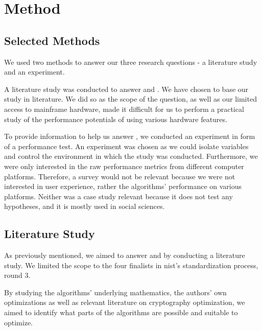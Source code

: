\chapter{Method}
\label{chapter:method}

\section{Selected Methods}
\label{section:method:selected-method}

We used two methods to answer our three research questions - a literature study and an experiment.

A literature study was conducted to answer  and . We have chosen to base our study in literature. We did so as the scope of the question, as well as our limited access to mainframe hardware, made it difficult for us to perform a practical study of the performance potentials of using various hardware features.

To provide information to help us answer , we conducted an experiment in form of a performance test. An experiment was chosen as we could isolate variables and control the environment in which the study was conducted. Furthermore, we were only interested in the raw performance metrics from different computer platforms. Therefore, a survey would not be relevant because we were not interested in user experience, rather the algorithms' performance on various platforms. Neither was a case study relevant because it does not test any hypotheses, and it is mostly used in social sciences\cite{wohlin2012}.

\section{Literature Study}
\label{section:method:literature-study}

As previously mentioned, we aimed to answer  and  by conducting a literature study. We limited the scope to the four finalists in \gls{nist}'s standardization process, round 3.

By studying the algorithms' underlying mathematics, the authors' own optimizations as well as relevant literature on cryptography optimization, we aimed to identify what parts of the algorithms are possible and suitable to optimize.

